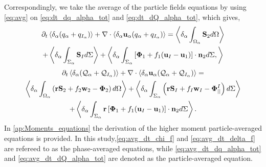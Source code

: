Correspondingly, we take the average of the particle fields equations by using \ref{eq:avg} on \ref{eq:dt_dq_alpha_tot} and \ref{eq:dt_dQ_alpha_tot}, which gives, 
\begin{multline}
    \partial_t \left<\delta_\alpha (q_\alpha+q_{I_\alpha})\right>
    + \mathbf{\nabla} \cdot \left<\delta_\alpha\textbf{u}_\alpha(q_\alpha+q_{I_\alpha})\right>
    = \left<\delta_\alpha\int_{\Omega_\alpha} \textbf{S}_2 d\Omega\right>\\
    + \left<\delta_\alpha\int_{\Sigma_\alpha} \textbf{S}_I d\Sigma\right>
    + \left<\delta_\alpha\int_{\Sigma_\alpha} \left[\mathbf{\Phi}_1 + f_1 (\textbf{u}_I-\textbf{u}_1) \right] \cdot \textbf{n}_2 d\Sigma,\right>
    \label{eq:avg_dt_dq_alpha_tot}
\end{multline}
\begin{multline}
    \partial_t \left<\delta_\alpha (\mathcal{Q}_\alpha+\mathcal{Q}_{I_\alpha})\right>
    + \mathbf{\nabla} \cdot \left<\delta_\alpha\textbf{u}_\alpha(\mathcal{Q}_\alpha+\mathcal{Q}_{I_\alpha})\right>
    =\\ \left<\delta_\alpha\int_{\Omega_\alpha} \left(
        \textbf{r} \textbf{S}_2         
        + f_2  \textbf{w}_2 
        - \mathbf{\Phi}_2
    \right) d\Omega\right>
    + \left<\delta_\alpha\int_{\Sigma_\alpha} \left(
        \textbf{r}\textbf{S}_I
        + f_I \textbf{w}_I
        - \mathbf{\Phi}_{||}^I
    \right) d\Sigma\right>\\
    + \left<\delta_\alpha\int_{\Sigma_\alpha} \textbf{r} \left[
        \mathbf{\Phi}_1
        + f_1 (\textbf{u}_I-\textbf{u}_1)
    \right]\cdot \textbf{n}_2  d\Sigma\right>.
    \label{eq:avg_dt_dQ_alpha_tot}
\end{multline}
In \ref{ap:Moments_equations} the derivation of the higher moment particle-averaged equations is provided. 
In this study,\ref{eq:avg_dt_chi_f} and \ref{eq:avg_dt_delta_f} are refereed to as the phase-averaged equations, while \ref{eq:avg_dt_dq_alpha_tot} and \ref{eq:avg_dt_dQ_alpha_tot} are denoted as the particle-averaged equation. 
